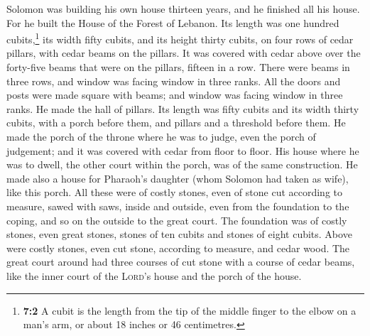  Solomon was building his own house thirteen years, and he
finished all his house.  For he built the House of the
Forest of Lebanon. Its length was one hundred cubits,\footnote{\textbf{7:2}
  A cubit is the length from the tip of the middle finger to the elbow
  on a man's arm, or about 18 inches or 46 centimetres.} its width fifty
cubits, and its height thirty cubits, on four rows of cedar pillars,
with cedar beams on the pillars.  It was covered with
cedar above over the forty-five beams that were on the pillars, fifteen
in a row.  There were beams in three rows, and window was
facing window in three ranks.  All the doors and posts
were made square with beams; and window was facing window in three
ranks.  He made the hall of pillars. Its length was fifty
cubits and its width thirty cubits, with a porch before them, and
pillars and a threshold before them.  He made the porch of
the throne where he was to judge, even the porch of judgement; and it
was covered with cedar from floor to floor.  His house
where he was to dwell, the other court within the porch, was of the same
construction. He made also a house for Pharaoh's daughter (whom Solomon
had taken as wife), like this porch.  All these were of
costly stones, even of stone cut according to measure, sawed with saws,
inside and outside, even from the foundation to the coping, and so on
the outside to the great court.  The foundation was of
costly stones, even great stones, stones of ten cubits and stones of
eight cubits.  Above were costly stones, even cut stone,
according to measure, and cedar wood.  The great court
around had three courses of cut stone with a course of cedar beams, like
the inner court of the \textsc{Lord}'s house and the porch of the house.

